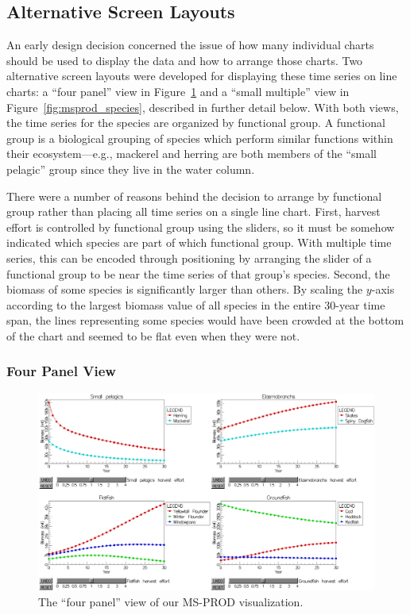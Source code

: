 \subsection{Alternative Screen Layouts}

An early design decision concerned the issue of how many individual charts should be used to display the data and how to arrange those charts.  Two alternative screen layouts were developed for displaying these time series on line charts: a ``four panel'' view in Figure~\ref{fig:msprod_group} and a ``small multiple'' view in Figure~\ref{fig:msprod_species}, described in further detail below.  With both views, the time series for the species are organized by functional group.  A functional group is a biological grouping of species which perform similar functions within their ecosystem---e.g., mackerel and herring are both members of the ``small pelagic'' group since they live in the water column.

There were a number of reasons behind the decision to arrange by functional group rather than placing all time series on a single line chart.  First, harvest effort is controlled by functional group using the sliders, so it must be somehow indicated which species are part of which functional group.  With multiple time series, this can be encoded through positioning by arranging the slider of a functional group to be near the time series of that group's species.  Second, the biomass of some species is significantly larger than others.  By scaling the $y$-axis according to the largest biomass value of all species in the entire 30-year time span, the lines representing some species would have been crowded at the bottom of the chart and seemed to be flat even when they were not.

\subsubsection{Four Panel View}

\begin{figure}[t]
	\centering
	\includegraphics[width=14cm]{figures/png/msprod_group.png}
	\caption[The ``four panel'' view of our MS-PROD visualization]{The ``four panel'' view of our MS-PROD visualization.}
	\label{fig:msprod_group}
\end{figure}

